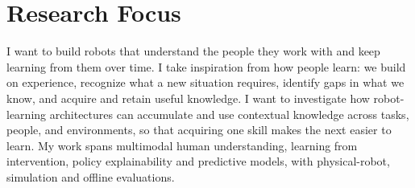 \documentclass[10pt]{article}
\begin{document}
\fontsize{10}{12}\selectfont
\section{Research Focus}
I want to build robots that understand the people they work with and keep learning from them over time. I take inspiration from how people learn: we build on experience, recognize what a new situation requires, identify gaps in what we know, and acquire and retain useful knowledge. I want to investigate how robot-learning architectures can accumulate and use contextual knowledge across tasks, people, and environments, so that acquiring one skill makes the next easier to learn. My work spans multimodal human understanding, learning from intervention, policy explainability and predictive models, with physical-robot, simulation and offline evaluations.
\end{document}
